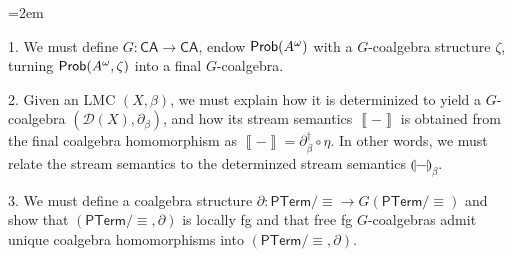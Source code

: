 \begin{list}{}{\leftmargin=2em}
\hypertarget{html:S4.I1.i1}{}
\item[]  1. %
\hypertarget{html:S4.I1.i1.p1}{} We must define %
\hypertarget{html:S4.I1.i1.p1.m1}{}\({G:\mathsf{CA}\to\mathsf{CA}}\), endow %
\hypertarget{html:S4.I1.i1.p1.m2}{}\({\text{\sf Prob}(A^{\omega})}\) with a %
\hypertarget{html:S4.I1.i1.p1.m3}{}\({G}\)-coalgebra structure %
\hypertarget{html:S4.I1.i1.p1.m4}{}\({\zeta}\), turning %
\hypertarget{html:S4.I1.i1.p1.m5}{}\({\text{\sf Prob}(A^{\omega},\zeta)}\) into a final %
\hypertarget{html:S4.I1.i1.p1.m6}{}\({G}\)-coalgebra.
\par\medskip
  
\hypertarget{html:S4.I1.i2}{}
\item[]  2. %
\hypertarget{html:S4.I1.i2.p1}{} Given an LMC %
\hypertarget{html:S4.I1.i2.p1.m1}{}\({(X,\beta)}\), we must explain how it is determinized to yield a %
\hypertarget{html:S4.I1.i2.p1.m2}{}\({G}\)-coalgebra %
\hypertarget{html:S4.I1.i2.p1.m3}{}\({(\mathcal{D}(X),\partial_{\beta})}\), and how its stream semantics %
\hypertarget{html:S4.I1.i2.p1.m4}{}\({\left\llbracket{-}\right\rrbracket}\) is obtained from the final coalgebra homomorphism as %
\hypertarget{html:S4.I1.i2.p1.m5}{}\({\left\llbracket{-}\right\rrbracket=\partial^{\dagger}_{\beta}\circ\eta}\). In other words, we must relate the stream semantics to the determinzed stream semantics %
\hypertarget{html:S4.I1.i2.p1.m6}{}\({\llparenthesis{-}\rrparenthesis_{\beta}}\).
\par\medskip
  
\hypertarget{html:S4.I1.i3}{}
\item[]  3. %
\hypertarget{html:S4.I1.i3.p1}{} We must define a coalgebra structure %
\hypertarget{html:S4.I1.i3.p1.m1}{}\({\partial:\mathsf{PTerm}/{\equiv}\to G(\mathsf{PTerm}/{\equiv})}\) and show that %
\hypertarget{html:S4.I1.i3.p1.m2}{}\({(\mathsf{PTerm}/{\equiv},\partial)}\) is locally fg and that free fg %
\hypertarget{html:S4.I1.i3.p1.m3}{}\({G}\)-coalgebras admit unique coalgebra homomorphisms into %
\hypertarget{html:S4.I1.i3.p1.m4}{}\({(\mathsf{PTerm}/{\equiv},\partial)}\).
\par\medskip
  

\end{list}
